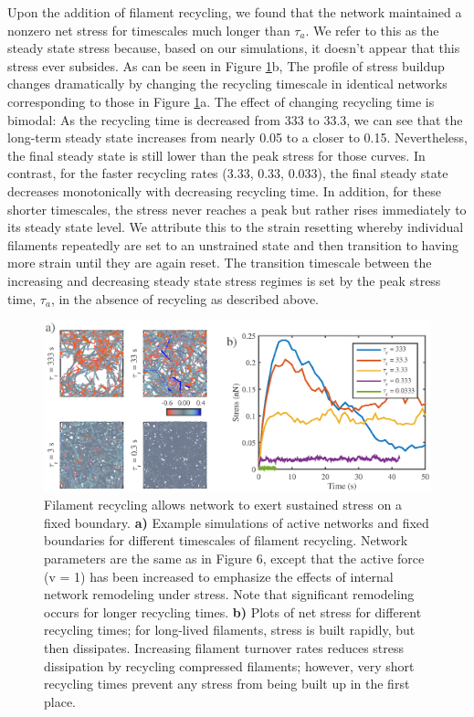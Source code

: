 \documentclass[10pt,letterpaper]{article}
\begin{document}
Upon the addition of filament recycling, we found that the network maintained a nonzero net stress for timescales much longer than $\tau_a$.  We refer to this as the steady state stress because, based on our simulations, it doesn't appear that this stress ever subsides.   As can be seen in Figure \ref{fig:active_rec}b, The profile of stress buildup changes dramatically by changing the recycling timescale in identical networks corresponding to those in Figure \ref{fig:active_rec}a.  The effect of changing recycling time is bimodal: As the recycling time is decreased from 333 to 33.3, we can see that the long-term steady state increases from nearly 0.05 to a closer to 0.15.  Nevertheless, the final steady state is still lower than the peak stress for those curves.  In contrast, for the faster recycling rates (3.33, 0.33, 0.033), the final steady state decreases monotonically with decreasing recycling time.  In addition, for these shorter timescales, the stress never reaches a peak but rather rises immediately to its steady state level.  We attribute this to the strain resetting whereby individual filaments repeatedly are set to an unstrained state and then transition to having more strain until they are again reset.  The transition timescale between the increasing and decreasing steady state stress regimes is set by the peak stress time, $\tau_a$, in the absence of recycling as described above.


\begin{figure}[h!]
	\centering
	\includegraphics[width=\hsize]{figures/figure5b}
	\caption{\label{fig:active_rec}  Filament recycling allows network to exert sustained stress on a fixed boundary. \textbf{a)}  Example simulations of active networks and fixed boundaries for different timescales of filament recycling. Network parameters are the same as in Figure 6, except that the active force (v = 1) has been increased to emphasize the effects of internal network remodeling under stress. Note that significant remodeling occurs for longer recycling times.  \textbf{b)} Plots of net stress for different recycling times; for long-lived filaments, stress is built rapidly, but then dissipates.  Increasing filament turnover rates reduces stress dissipation by recycling compressed filaments; however, very short recycling times prevent any stress from being built up in the first place. }
\end{figure}
\end{document}
